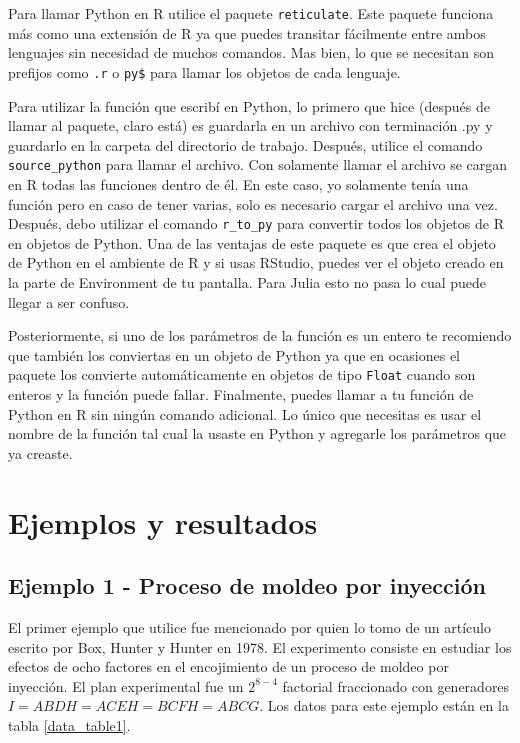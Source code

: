 Para llamar Python en R utilice el paquete \texttt{reticulate}. Este paquete funciona más como una extensión de R ya que puedes transitar fácilmente entre ambos lenguajes sin necesidad de muchos comandos. Mas bien, lo que se necesitan son prefijos como \texttt{.r} o \texttt{py\$} para llamar los objetos de cada lenguaje.

Para utilizar la función que escribí en Python, lo primero que hice (después de llamar al paquete, claro está) es guardarla en un archivo con terminación \textsf{.py} y guardarlo en la carpeta del directorio de trabajo. Después, utilice el comando \texttt{source\_python} para llamar el archivo. Con solamente llamar el archivo se cargan en R todas las funciones dentro de él. En este caso, yo solamente tenía una función pero en caso de tener varias, solo es necesario cargar el archivo una vez. Después, debo utilizar el comando \texttt{r\_to\_py} para convertir todos los objetos de R en objetos de Python. Una de las ventajas de este paquete es que crea el objeto de Python en el ambiente de R y si usas RStudio, puedes ver el objeto creado en la parte de \textsf{Environment} de tu pantalla. Para Julia esto no pasa lo cual puede llegar a ser confuso. 

Posteriormente, si uno de los parámetros de la función es un entero te recomiendo que también los conviertas en un objeto de Python ya que en ocasiones el paquete los convierte automáticamente en objetos de tipo \texttt{Float} cuando son enteros y la función puede fallar. Finalmente, puedes llamar a tu función de Python en R sin ningún comando adicional. Lo único que necesitas es usar el nombre de la función tal cual la usaste en Python y agregarle los parámetros que ya creaste. 

\section{Ejemplos y resultados}

\subsection{Ejemplo 1 - Proceso de moldeo por inyección}

El primer ejemplo que utilice fue mencionado por \cite{meyer1996} quien lo tomo de un artículo escrito por Box, Hunter y Hunter en 1978. El experimento consiste en estudiar los efectos de ocho factores en el encojimiento de un proceso de moldeo por inyección. El plan experimental fue un $2^{8-4}$ factorial fraccionado con generadores $I = ABDH = ACEH = BCFH = ABCG$. Los datos para este ejemplo están en la tabla \ref{data_table1}. 

